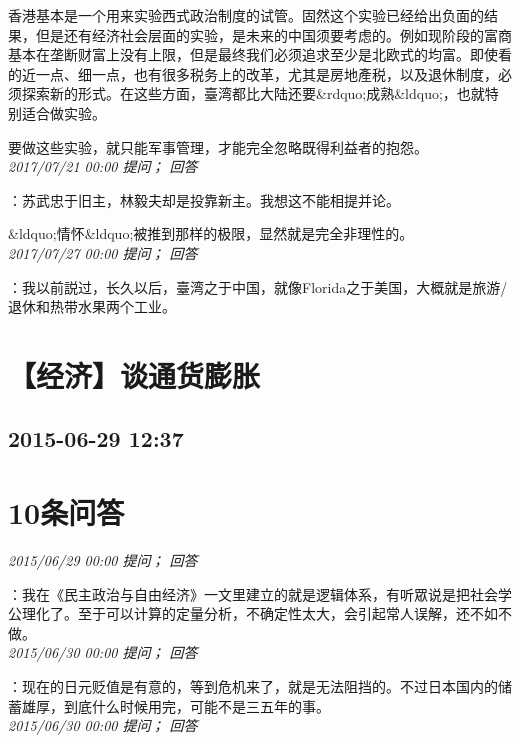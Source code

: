 \documentclass[twocolumn]{ctexart}
\begin{document}
香港基本是一个用来实验西式政治制度的试管。固然这个实验已经给出负面的结果，但是还有经济社会层面的实验，是未来的中国须要考虑的。例如现阶段的富商基本在垄断财富上没有上限，但是最终我们必须追求至少是北欧式的均富。即使看的近一点、细一点，也有很多税务上的改革，尤其是房地產税，以及退休制度，必须探索新的形式。在这些方面，臺湾都比大陆还要\&rdquo;成熟\&ldquo;，也就特别适合做实验。

要做这些实验，就只能军事管理，才能完全忽略既得利益者的抱怨。\\

\textit{\hfill\noindent\small 2017/07/21 00:00 提问； 回答}

：苏武忠于旧主，林毅夫却是投靠新主。我想这不能相提并论。

\&ldquo;情怀\&ldquo;被推到那样的极限，显然就是完全非理性的。\\

\textit{\hfill\noindent\small 2017/07/27 00:00 提问； 回答}

：我以前説过，长久以后，臺湾之于中国，就像Florida之于美国，大概就是旅游/退休和热带水果两个工业。\\


\section{【经济】谈通货膨胀}
\subsection{2015-06-29 12:37}


\section{10条问答}

\textit{\hfill\noindent\small 2015/06/29 00:00 提问； 回答}

：我在《民主政治与自由经济》一文里建立的就是逻辑体系，有听眾说是把社会学公理化了。至于可以计算的定量分析，不确定性太大，会引起常人误解，还不如不做。\\

\textit{\hfill\noindent\small 2015/06/30 00:00 提问； 回答}

：现在的日元贬值是有意的，等到危机来了，就是无法阻挡的。不过日本国内的储蓄雄厚，到底什么时候用完，可能不是三五年的事。\\

\textit{\hfill\noindent\small 2015/06/30 00:00 提问； 回答}
\end{document}
